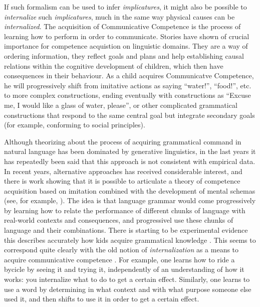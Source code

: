 \documentclass[
		twoside,openright,titlepage,numbers=noenddot,manychapters,
		headinclude,%
                footinclude=false,cleardoublepage=empty,
                BCOR=5mm,
		fontsize=11pt, %
                 enabledeprecatedfontcommands]{scrreprt}
\begin{document}
If such formalism can be used to infer \emph{implicatures}, it might also be possible to \emph{internalize} such \emph{implicatures}, much in the same way physical causes can be \emph{internalized}. The acquisition of Communicative Competence is the process of learning how to perform in order to communicate. Stories have shown of crucial importance for competence acquistion on linguistic domains. They are  a way of ordering information, they reflect goals and plans and help establishing causal relations within the cognitive development of children, which then have consequences in their behaviour. As a child acquires Communicatve Competence,  he will progressively shift from imitative actions as saying ``water!'', ``food!'', etc. to more complex constructions, ending eventually with constructions as ``Excuse me, I would like a glass of water, please'', or other complicated grammatical constructions that respond to the same central goal but integrate secondary goals (for example, conforming to social principles).

Although theorizing about the process of acquiring grammatical command in natural language has been dominated by generative linguistics, in the last years it has repeatedly been said  that this approach is not consistent with empirical data. In recent years, alternative approaches has received considerable interest, and there is work showing that it is possible to articulate a theory of competence acquisition based on imitation combined with the development of mental schemas (see, for example, \cite{tomasello2003clu}). The idea is that language grammar would come progressively by learning how to relate the performance of different chunks of language with real-world contexts and consequences, and progressivel use these chunks of language and their combinations.  There is starting to be experimental evidence this describes accurately how kids acquire grammatical knowledge \cite[]{bannard2009modeling}.
This seems to correspond quite clearly with the old notion of \emph{internalization} as a means to acquire communicative competence \cite[]{vygotsky1964tal}. For example, one learns how to ride a bycicle by seeing it and trying it, independently of an understanding of how it works: you internalize what to do to get a certain effect.  Similarly, one learns to use a word by determining in what context and with what purpose someone else used it, and then shifts to use it in order to get a certain effect.
\end{document}
